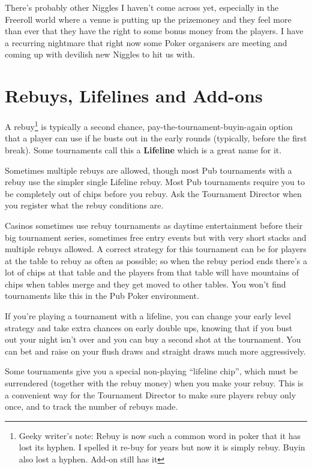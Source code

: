 There's probably other Niggles I haven't come across yet,
especially in the Freeroll world where a venue is putting up the
prizemoney and they feel more than ever that they have the right
to some bonus money from the players. I have a recurring
nightmare that right now some Poker organisers are meeting and
coming up with devilish new Niggles to hit us with.

\section{Rebuys, Lifelines and Add-ons}

A rebuy\footnote{Geeky writer's note: Rebuy is now such a common word in
poker that it has lost its hyphen. I spelled it re-buy for years but
now it is simply rebuy. Buyin also lost a hyphen.  Add-on still has it}
is typically a second chance, pay-the-tournament-buyin-again
option that a player can use if he busts out in the early rounds
(typically, before the first break). Some tournaments call this a
\textbf{Lifeline} which is a great name for it.

Sometimes multiple rebuys are allowed, though most Pub tournaments
with a rebuy use the simpler single Lifeline rebuy. Most Pub
tournaments require you to be completely out of chips before you
rebuy. Ask the Tournament Director when you register what
the rebuy conditions are.

Casinos sometimes use rebuy tournaments as daytime entertainment
before their big tournament series, sometimes free entry events
but with very short stacks and multiple rebuys allowed. A correct
strategy for this tournament can be for players at the table
to rebuy as often as possible; so when the rebuy period ends there's
a lot of chips at that table and the players from that table will
have mountains of chips when tables merge and they get moved to
other tables. You won't find tournaments like this in the Pub Poker
environment.

If you're playing a tournament with a lifeline, you can change
your early level strategy and take extra chances on early
double ups, knowing that if you bust out your night isn't over and
you can buy a second shot at the tournament. You can bet and raise
on your flush draws and straight draws much more aggressively.

Some tournaments give you a special non-playing ``lifeline chip'',
which must be surrendered (together with the rebuy money) when you
make your rebuy. This is a convenient way for the Tournament
Director to make sure players rebuy only once, and to track the number
of rebuys made.

